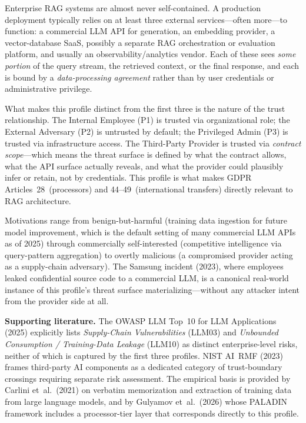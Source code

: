 \begin{prosebox}
Enterprise RAG systems are almost never self-contained. A production
deployment typically relies on at least three external services---often
more---to function: a commercial LLM API for generation, an embedding
provider, a vector-database SaaS, possibly a separate RAG orchestration
or evaluation platform, and usually an observability/analytics vendor. Each
of these sees \emph{some portion} of the query stream, the retrieved
context, or the final response, and each is bound by a
\emph{data-processing agreement} rather than by user credentials or
administrative privilege.

What makes this profile distinct from the first three is the nature of
the trust relationship. The Internal Employee (P1) is trusted via
organizational role; the External Adversary (P2) is untrusted by default;
the Privileged Admin (P3) is trusted via infrastructure access. The
Third-Party Provider is trusted via \emph{contract scope}---which means
the threat surface is defined by what the contract allows, what the API
surface actually reveals, and what the provider could plausibly infer or
retain, not by credentials. This profile is what makes GDPR
Articles~28~(processors) and 44--49~(international transfers) directly
relevant to RAG architecture.

Motivations range from benign-but-harmful (training data ingestion for
future model improvement, which is the default setting of many commercial
LLM APIs as of 2025) through commercially self-interested (competitive
intelligence via query-pattern aggregation) to overtly malicious
(a compromised provider acting as a supply-chain adversary). The Samsung
incident (2023), where employees leaked confidential source code to a
commercial LLM, is a canonical real-world instance of this profile's
threat surface materializing---without any attacker intent from the
provider side at all.

\medskip
\textbf{Supporting literature.}
The OWASP LLM Top~10 for LLM Applications (2025) explicitly lists
\emph{Supply-Chain Vulnerabilities} (LLM03) and \emph{Unbounded Consumption /
Training-Data Leakage} (LLM10) as distinct enterprise-level risks,
neither of which is captured by the first three profiles.
NIST AI~RMF (2023) frames third-party AI components as a dedicated
category of trust-boundary crossings requiring separate risk assessment.
The empirical basis is provided by Carlini et~al.\ (2021) on verbatim
memorization and extraction of training data from large language models, and by
Gulyamov et~al.\ (2026) whose PALADIN framework includes a processor-tier
layer that corresponds directly to this profile.
\end{prosebox}

